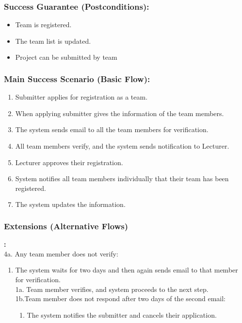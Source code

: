     


    
    
    
    \subsubsection*{Success Guarantee (Postconditions):}
    \begin{itemize}
    \itemsep-1em 
       \item Team is registered.
       \item The team list is updated.
       \item Project can be submitted by team
       
    \end{itemize}
    
    
    
    \subsubsection*{Main Success Scenario (Basic Flow):}
    \begin{enumerate}
        \itemsep-1em 
        \item Submitter applies for registration as a team.
        \item When applying submitter gives the information of the team members.
        \item The system sends email to all the team members for verification.
         \item All team members verify, and the system sends notification to Lecturer. 
         \item Lecturer approves their registration.
          \item System notifies all team members individually that their team has been registered. 
          \item The system updates the information.
    \end{enumerate}
    
    
    
    
     \subsubsection*{Extensions (Alternative Flows)}\textbf{:}
     \newline
     \\
     4a. Any team member does not verify:
     \begin{enumerate}
         \itemsep-1em 
        \item The system waits for two days and then again sends email to that member for verification.
        \\
        1a. Team member verifies, and system proceeds to the next step.
        \\
        1b.Team member does not respond after two days of the second email:
        \begin{enumerate}
            \item The system notifies the submitter and cancels their application.
        \end{enumerate}
    \end{enumerate}
    


